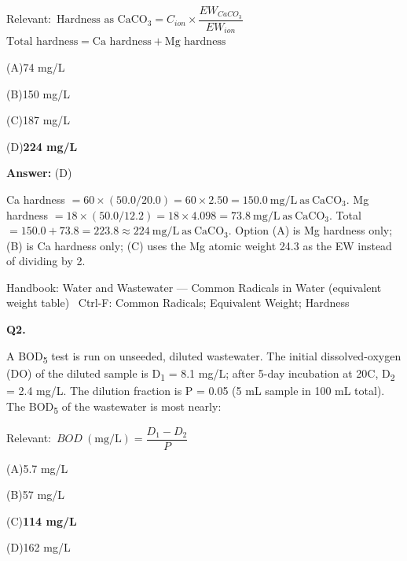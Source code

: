 \documentclass[11pt]{article}
\newcommand{\correct}[1]{\textbf{#1}\;{\color{accent}$\checkmark$}}
\newcommand{\optline}[2]{\par\noindent\hspace{1.2em}(#1)\hspace{0.6em}#2}
\begin{document}
{\small\color{soft}Relevant:}\ $\text{Hardness as CaCO}_3 = C_{ion}\times \dfrac{EW_{CaCO_3}}{EW_{ion}}$ \quad $\text{Total hardness} = \text{Ca hardness} + \text{Mg hardness}$\par\vspace{3pt}
\optline{A}{74 mg/L}
\optline{B}{150 mg/L}
\optline{C}{187 mg/L}
\optline{D}{\correct{224 mg/L}}
\par\vspace{3pt}
\vspace{2pt}\par\noindent\colorbox{boxbg}{\parbox{\dimexpr\linewidth-2\fboxsep\relax}{%
\vspace{2pt}\textbf{Answer:} (D)\par\vspace{2pt}
{\small Ca hardness $= 60\times(50.0/20.0) = 60\times 2.50 = 150.0\ \mathrm{mg/L\ as\ CaCO_3}$.  Mg hardness $= 18\times(50.0/12.2) = 18\times 4.098 = 73.8\ \mathrm{mg/L\ as\ CaCO_3}$.  Total $= 150.0 + 73.8 = 223.8 \approx 224\ \mathrm{mg/L\ as\ CaCO_3}$. Option (A) is Mg hardness only; (B) is Ca hardness only; (C) uses the Mg atomic weight 24.3 as the EW instead of dividing by 2.}\par\vspace{2pt}
{\footnotesize\color{soft}Handbook: Water and Wastewater --- Common Radicals in Water (equivalent weight table) \textbullet\ Ctrl-F: Common Radicals; Equivalent Weight; Hardness}\vspace{2pt}
}}
\vspace{9pt}
\filbreak
\textbf{\color{accent}Q2.}\par\vspace{2pt}
A BOD\textsubscript{5} test is run on unseeded, diluted wastewater. The initial dissolved-oxygen (DO) of the diluted sample is D\textsubscript{1} = 8.1 mg/L; after 5-day incubation at 20\textdegree{}C, D\textsubscript{2} = 2.4 mg/L. The dilution fraction is P = 0.05 (5 mL sample in 100 mL total). The BOD\textsubscript{5} of the wastewater is most nearly:\par\vspace{3pt}
{\small\color{soft}Relevant:}\ $BOD\ (\mathrm{mg/L}) = \dfrac{D_1 - D_2}{P}$\par\vspace{3pt}
\optline{A}{5.7 mg/L}
\optline{B}{57 mg/L}
\optline{C}{\correct{114 mg/L}}
\optline{D}{162 mg/L}
\par\vspace{3pt}
\end{document}
